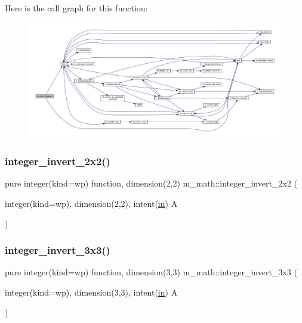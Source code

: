 Here is the call graph for this function\+:
\nopagebreak
\begin{figure}[H]
\begin{center}
\leavevmode
\includegraphics[width=350pt]{namespacem__math_a8a690554ceefdd859166fd1c44b40969_cgraph}
\end{center}
\end{figure}
\mbox{\label{namespacem__math_abccb5c1bfc17724aca07448be7b1d2c8}} 
\subsubsection{\texorpdfstring{integer\+\_\+invert\+\_\+2x2()}{integer\_invert\_2x2()}}
{\footnotesize\ttfamily pure integer(kind=wp) function, dimension(2,2) m\+\_\+math\+::integer\+\_\+invert\+\_\+2x2 (\begin{DoxyParamCaption}\item[{integer(kind=wp), dimension(2,2), intent(\hyperlink{M__journal_83_8txt_afce72651d1eed785a2132bee863b2f38}{in})}]{A }\end{DoxyParamCaption})\hspace{0.3cm}{\ttfamily [private]}}

\mbox{\label{namespacem__math_aa8aaf1df6257440a637e51922f2d482f}} 
\subsubsection{\texorpdfstring{integer\+\_\+invert\+\_\+3x3()}{integer\_invert\_3x3()}}
{\footnotesize\ttfamily pure integer(kind=wp) function, dimension(3,3) m\+\_\+math\+::integer\+\_\+invert\+\_\+3x3 (\begin{DoxyParamCaption}\item[{integer(kind=wp), dimension(3,3), intent(\hyperlink{M__journal_83_8txt_afce72651d1eed785a2132bee863b2f38}{in})}]{A }\end{DoxyParamCaption})\hspace{0.3cm}{\ttfamily [private]}}


